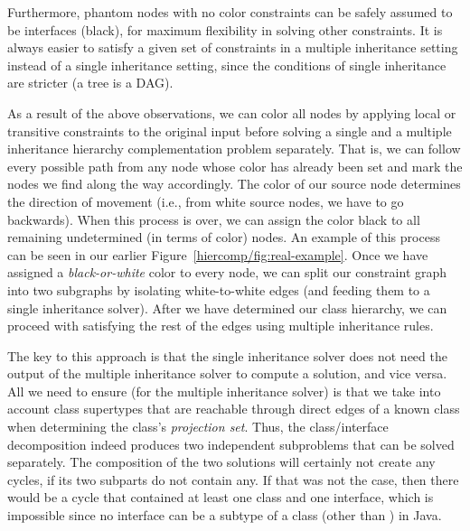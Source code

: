 Furthermore, phantom nodes with no color constraints can be safely
assumed to be interfaces (black), for maximum flexibility in solving
other constraints. It is always easier to satisfy a given set
of constraints in a multiple inheritance setting instead of a single
inheritance setting, since the conditions of single inheritance are
stricter (a tree is a DAG).

As a result of the above observations, we can color all nodes by
applying local or transitive constraints to the original input before
solving a single and a multiple inheritance hierarchy complementation
problem separately.  That is, we can follow every possible path from
any node whose color has already been set and mark the nodes we find
along the way accordingly. The color of our source node determines the
direction of movement (i.e., from white source nodes, we have to go
backwards). When this process is over, we can assign the color black
to all remaining undetermined (in terms of color) nodes.  An example
of this process can be seen in our earlier
Figure~\ref{hiercomp/fig:real-example}. Once we have assigned a
\emph{black-or-white} color to every node, we can split our constraint
graph into two subgraphs by isolating white-to-white edges (and
feeding them to a single inheritance solver). After we have determined
our class hierarchy, we can proceed with satisfying the rest of the
edges using multiple inheritance rules.

The key to this approach is that the single inheritance solver does
not need the output of the multiple inheritance solver to compute a
solution, and vice versa. All we need to ensure (for the multiple
inheritance solver) is that we take into account class supertypes that
are reachable through direct edges of a known class when determining
the class's \emph{projection set}. Thus, the class/interface
decomposition indeed produces two independent subproblems that can be
solved separately. The composition of the two solutions will certainly
not create any cycles, if its two subparts do not contain any. If that
was not the case, then there would be a cycle that contained at least
one class and one interface, which is impossible since no interface
can be a subtype of a class (other than ) in Java.

